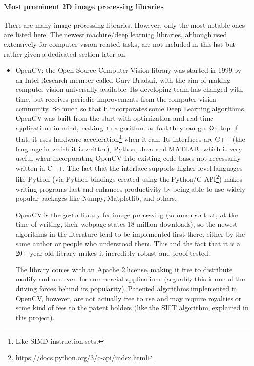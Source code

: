 \documentclass[../main.tex]{subfiles}
\begin{document}
\paragraph{Most prominent 2D image processing libraries} 
There are many image processing libraries. However, only the most notable ones are listed here. The newest machine/deep learning libraries, although used extensively for computer vision-related tasks, are not included in this list but rather given a dedicated section later on.
\begin{itemize}
    \item OpenCV: the Open Source Computer Vision library was started in 1999 by an Intel Research member called Gary Bradski, with the aim of making computer vision universally available. Its developing team has changed with time, but receives periodic improvements from the computer vision community. So much so that it incorporates some Deep Learning algorithms. OpenCV was built from the start with optimization and real-time applications in mind, making its algorithms as fast they can go. On top of that, it uses hardware acceleration\footnote{Like SIMD instruction sets.} when it can. Its interfaces are C++ (the language in which it is written), Python, Java and MATLAB, which is very useful when incorporating OpenCV into existing code bases not necessarily written in C++. The fact that the interface supports higher-level languages like Python (via Python bindings created using the Python/C API\footnote{\url{https://docs.python.org/3/c-api/index.html}}) makes writing programs fast and enhances productivity by being able to use widely popular packages like Numpy, Matplotlib, and others.
    
    OpenCV is the go-to library for image processing (so much so that, at the time of writing, their webpage states 18 million downloads), so the newest algorithms in the literature tend to be implemented first there, either by the same author or people who understood them. This and the fact that it is a 20+ year old library makes it incredibly robust and proof tested.

    The library comes with an Apache 2 license, making it free to distribute, modify and use even for commercial applications (arguably this is one of the driving forces behind its popularity). Patented algorithms implemented in OpenCV, however, are not actually free to use and may require royalties or some kind of fees to the patent holders (like the SIFT algorithm, explained in this project).


\end{itemize}
\end{document}
